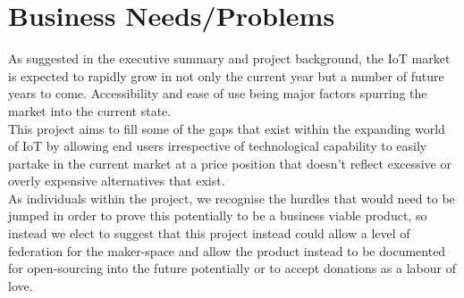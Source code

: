 \documentclass{article}
\newcounter{num}
\begin{document}
    \section{Business Needs/Problems}
        As suggested in the executive summary and project background, the IoT market is expected 
        to rapidly grow in not only the current year but a number of future years to come. 
        Accessibility and ease of use being major factors spurring the market into the current 
        state.
        \\
        This project aims to fill some of the gaps that exist within the expanding world of IoT
        by allowing end users irrespective of technological capability to easily partake in the 
        current market at a price position that doesn't reflect excessive or overly expensive 
        alternatives that exist.
        \\
        As individuals within the project, we recognise the hurdles that would need to be jumped
        in order to prove this potentially to be a business viable product, so instead we elect
        to suggest that this project instead could allow a level of federation for the maker-space
        and allow the product instead to be documented for open-sourcing into the future potentially
        or to accept donations as a labour of love.
\end{document}
